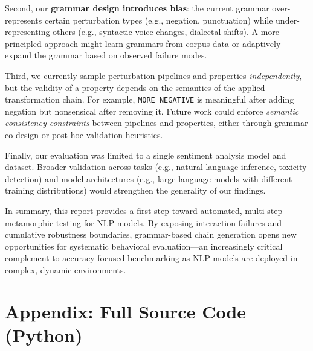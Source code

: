 \documentclass[11pt]{article}
\begin{document}
Second, our \textbf{grammar design introduces bias}: the current grammar over-represents certain perturbation types (e.g., negation, punctuation) while under-representing others (e.g., syntactic voice changes, dialectal shifts). A more principled approach might learn grammars from corpus data or adaptively expand the grammar based on observed failure modes.

Third, we currently sample perturbation pipelines and properties \textit{independently}, but the validity of a property depends on the semantics of the applied transformation chain. For example, \texttt{MORE\_NEGATIVE} is meaningful after adding negation but nonsensical after removing it. Future work could enforce \textit{semantic consistency constraints} between pipelines and properties, either through grammar co-design or post-hoc validation heuristics.

Finally, our evaluation was limited to a single sentiment analysis model and dataset. Broader validation across tasks (e.g., natural language inference, toxicity detection) and model architectures (e.g., large language models with different training distributions) would strengthen the generality of our findings.

In summary, this report provides a first step toward automated, multi-step metamorphic testing for NLP models. By exposing interaction failures and cumulative robustness boundaries, grammar-based chain generation opens new opportunities for systematic behavioral evaluation—an increasingly critical complement to accuracy-focused benchmarking as NLP models are deployed in complex, dynamic environments.

\newpage
\appendix

\section{Appendix: Full Source Code (Python)}
\label{app:code}
\end{document}
